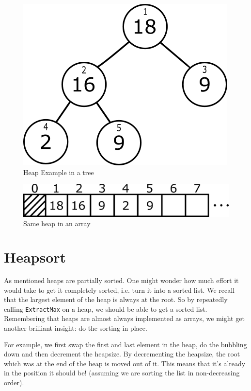 \begin{figure}[h]
    \centering
    \includegraphics[scale=0.45]{Images/heap_array_tree.png}
    \caption{Heap Example in a tree}
    \label{fig:heap_tree}
\end{figure}
\begin{figure}[h]
    \centering
    \includegraphics[scale=0.45]{Images/heap_array.png}
    \caption{Same heap in an array}
    \label{fig:heap_array}
\end{figure}

\section{Heapsort}\label{sec:heapsort}
As mentioned heaps are partially sorted. One might wonder how much effort it would take to get it completely sorted, i.e. turn it into a sorted list. We recall that the largest element of the heap is always at the root. So by repeatedly calling \texttt{ExtractMax} on a heap, we should be able to get a sorted list. Remembering that heaps are almost always implemented as arrays, we might get another brilliant insight: do the sorting in place.

For example, we first swap the first and last element in the heap, do the bubbling down and then decrement the heapsize. By decrementing the heapsize, the root which was at the end of the heap is moved out of it. This means that it's already in the position it should be! (assuming we are sorting the list in non-decreasing order).

